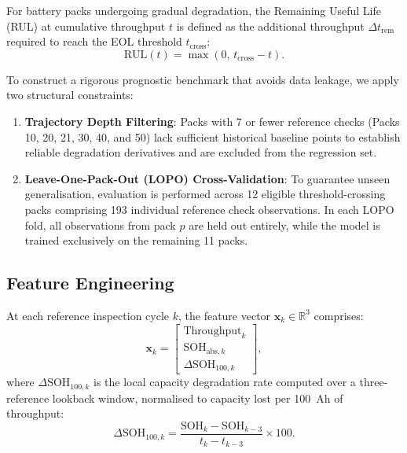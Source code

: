 For battery packs undergoing gradual degradation, the Remaining Useful Life
(RUL) at cumulative throughput $t$ is defined as the additional throughput
$\Delta t_{\mathrm{rem}}$ required to reach the EOL threshold
$t_{\mathrm{cross}}$:
\begin{equation}
  \mathrm{RUL}(t) = \max\left(0,\, t_{\mathrm{cross}} - t\right).
\end{equation}

To construct a rigorous prognostic benchmark that avoids data leakage,
we apply two structural constraints:
\begin{enumerate}
  \item \textbf{Trajectory Depth Filtering}: Packs with 7 or fewer reference
  checks (Packs 10, 20, 21, 30, 40, and 50) lack
  sufficient historical baseline points to establish reliable degradation
  derivatives and are excluded from the regression set.
  \item \textbf{Leave-One-Pack-Out (LOPO) Cross-Validation}: To guarantee
  unseen generalisation, evaluation is performed across 12 eligible
  threshold-crossing packs comprising 193 individual reference check
  observations. In each LOPO fold, all observations from pack $p$ are held
  out entirely, while the model is trained exclusively on the remaining
  11 packs.
\end{enumerate}

\subsection{Feature Engineering}

At each reference inspection cycle $k$, the feature vector
$\mathbf{x}_k \in \mathbb{R}^3$ comprises:
\begin{equation}
  \mathbf{x}_k = \begin{bmatrix}
    \mathrm{Throughput}_k \\
    \mathrm{SOH}_{\mathrm{abs}, k} \\
    \Delta\mathrm{SOH}_{100, k}
  \end{bmatrix},
\end{equation}
where $\Delta\mathrm{SOH}_{100, k}$ is the local capacity degradation rate
computed over a three-reference lookback window, normalised to capacity
lost per \SI{100}{Ah} of throughput:
\begin{equation}
  \Delta\mathrm{SOH}_{100, k} = \frac{\mathrm{SOH}_k - \mathrm{SOH}_{k-3}}
  {t_k - t_{k-3}} \times 100.
\end{equation}

